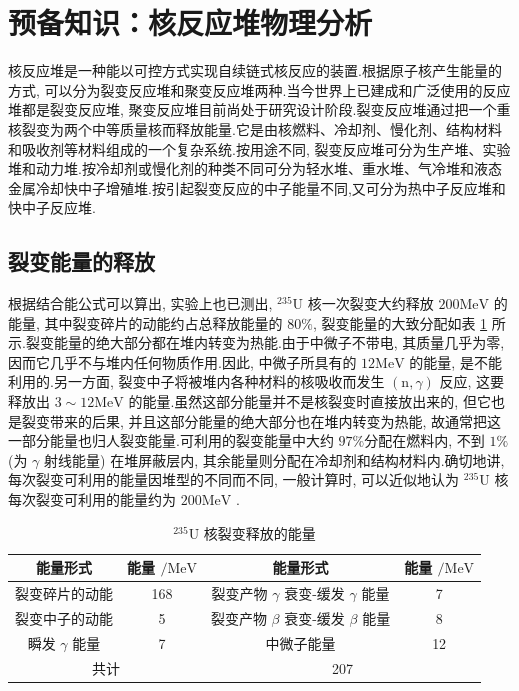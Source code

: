 \documentclass{Sichuan Normal University}
\begin{document}

\section{预备知识：核反应堆物理分析}

核反应堆是一种能以可控方式实现自续链式核反应的装置.根据原子核产生能量的方式, 可以分为裂变反应堆和聚变反应堆两种\cite{XieZhongShengHeFanYingDuiWuLiFenXi2020}.当今世界上已建成和广泛使用的反应堆都是裂变反应堆, 聚变反应堆目前尚处于研究设计阶段.裂变反应堆通过把一个重核裂变为两个中等质量核而释放能量.它是由核燃料、冷却剂、慢化剂、结构材料和吸收剂等材料组成的一个复杂系统.按用途不同, 裂变反应堆可分为生产堆、实验堆和动力堆.按冷却剂或慢化剂的种类不同可分为轻水堆、重水堆、气冷堆和液态金属冷却快中子增殖堆.按引起裂变反应的中子能量不同,又可分为热中子反应堆和快中子反应堆.

\subsection{裂变能量的释放}

根据结合能公式可以算出, 实验上也已测出, ${ }^{235} \mathrm{U}$ 核一次裂变大约释放 $200 \mathrm{MeV}$ 的能量,
其中裂变碎片的动能约占总释放能量的 $80 \%$, 裂变能量的大致分配如表 \ref{tab:核裂变释放的能量} 所示.裂变能量的绝大部分都在堆内转变为热能.由于中微子不带电, 其质量几乎为零, 因而它几乎不与堆内任何物质作用.因此, 中微子所具有的 $12 \mathrm{MeV}$ 的能量, 是不能利用的.另一方面, 裂变中子将被堆内各种材料的核吸收而发生 $(\mathrm{n}, \gamma)$ 反应, 这要释放出 $3 \sim 12 \mathrm{MeV}$ 的能量.虽然这部分能量并不是核裂变时直接放出来的, 但它也是裂变带来的后果, 并且这部分能量的绝大部分也在堆内转变为热能, 故通常把这一部分能量也归人裂变能量.可利用的裂变能量中大约 $97 \%$分配在燃料内, 不到 $1 \%$ (为 $\gamma$ 射线能量) 在堆屏蔽层内, 其余能量则分配在冷却剂和结构材料内.确切地讲, 每次裂变可利用的能量因堆型的不同而不同, 一般计算时, 可以近似地认为 ${ }^{235} \mathrm{U}$ 核每次裂变可利用的能量约为 $200 \mathrm{MeV}$ .

\begin{table}[H]
    \caption{${ }^{235} \mathrm{U}$ 核裂变释放的能量}
    \label{tab:核裂变释放的能量}
    \centering
    \begin{tabular}{cc|cc}
        \toprule 
        能量形式 & 能量 $/ \mathrm{MeV}$ & 能量形式 & 能量 $/ \mathrm{MeV}$\\
        \midrule 
        裂变碎片的动能 & 168 & 裂变产物 $\gamma$ 衰变-缓发 $\gamma$ 能量 & 7\\
        裂变中子的动能 & 5 & 裂变产物 $\beta$ 衰变-缓发 $\beta$ 能量 & 8\\
        瞬发 $\gamma$ 能量 & 7 & 中微子能量 & 12\\
        \midrule
        \multicolumn{2}{c}{共计} & \multicolumn{2}{c}{207} \\
        \bottomrule
    \end{tabular}
\end{table}
    
\end{document}
